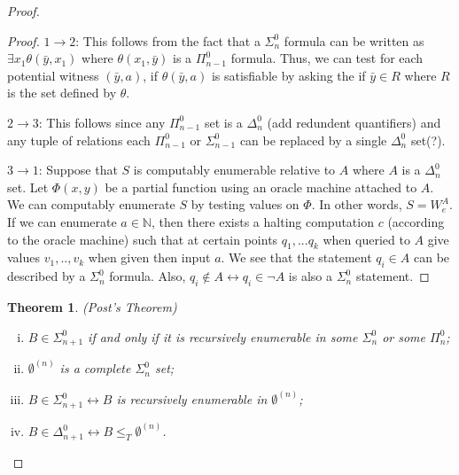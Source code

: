 \documentclass[a4paper,10pt]{article}
\newtheorem{theorem}{Theorem}[section]
\newcommand*\NN{\mathbb{N}}
\newcommand*\map{\rightarrow}
\newcommand*\n{\newline\par}
\newcommand*\biject{\leftrightarrow}
\begin{document}
\begin{proof}
     \begin{proof}
      $1 \map 2$: This follows from the fact that a $\Sigma_n^0$ formula can be written as $\exists x_1 \theta(\bar{y},x_1)$ where $\theta(x_1,\bar{y})$  is a $\Pi_{n-1}^0$ formula. Thus, we can test for each potential witness $(\bar{y},a)$, if
      $\theta(\bar{y},a)$ is satisfiable by asking the if $\bar{y} \in R$ where $R$ is the set defined by $\theta$. \n
      $2 \map 3$: This follows since any $\Pi_{n-1}^0$ set is a $\Delta_n^0$ (add redundent quantifiers) and any tuple of relations each $\Pi_{n-1}^0$ or $\Sigma_{n-1}^0$ can be replaced by a single $\Delta_n^0$ set(?). \n
      $3 \map 1$: Suppose that $S$ is computably enumerable relative to $A$ where $A$ is a $\Delta_n^0$ set. Let $\Phi(x,y )$ be a partial function using an oracle machine attached to $A$. We can computably enumerate $S$ by testing values on $\Phi$. In other words, $S = W_e^A$. If we can enumerate $a \in \NN$, then there exists a halting computation $c$ (according to the oracle machine) such that at certain points $q_1,...q_k$ when queried to $A$ give values $v_1,..,v_k$ when given then input $a$. We see that
      the statement $q_i \in A$ can be described by a $\Sigma_n^0$ formula. Also, $q_i \not\in A \biject q_i \in \neg A$ is also a $\Sigma_n^0$ statement.
     \end{proof}


     \begin{theorem}
      (Post's Theorem)
      \begin{enumerate}[i.]
       \item $B \in \Sigma_{n+1}^0$ if and only if it is recursively enumerable in some $\Sigma_{n}^0$ or some $\Pi_{n}^0$;
       \item $\emptyset^{(n)}$ is a complete $\Sigma_n^0$ set;
       \item $B \in \Sigma_{n+1}^0 \biject B$ is recursively enumerable in $\emptyset^{(n)}$; 
       \item $B \in \Delta_{n+1}^0 \biject B \leq_T \emptyset^{(n)}$.
      \end{enumerate}
      

\end{theorem}
\end{proof}
\end{document}
